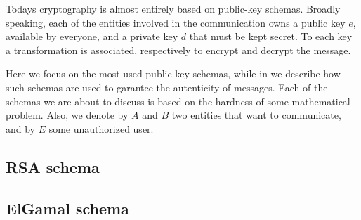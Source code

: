 \documentclass{subfiles}
\begin{document}
    Todays cryptography is almost entirely based on public-key schemas.
        Broadly speaking, each of the entities involved in the communication 
        owns a public key \(e\), available by everyone, and a private key \(d\)
        that must be kept secret. To each key a transformation is associated,
        respectively to encrypt and decrypt the message.

    Here we focus on the most used public-key schemas, while in 
        we describe how such schemas are used to garantee the autenticity of messages.
        Each of the schemas we are about to discuss is based on the hardness of some mathematical problem.
        Also, we denote by \(A\) and \(B\) two entities that want to communicate,
        and by \(E\) some unauthorized user.

    \subsection{RSA schema}
    

    \subsection{ElGamal schema}
    
\end{document}
